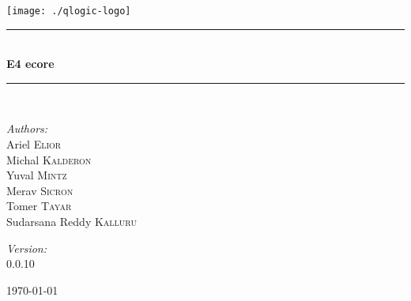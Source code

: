 \documentclass[11pt,fleqn,hidelinks,oneside]{book} %
\newcommand{\HRule}{\rule{\linewidth}{0.5mm}}
\begin{document}
\begin{titlepage}
\begin{center}

\texttt{[image: ./qlogic-logo]}~\\[3cm]

\HRule \\[0.4cm]
{ \huge \bfseries E4 ecore \\[0.4cm] }

\HRule \\[1.5cm]

\begin{minipage}{0.4\textwidth}
\begin{flushleft} \large
\emph{Authors:}\\
Ariel \textsc{Elior} \\
Michal \textsc{Kalderon} \\
Yuval \textsc{Mintz} \\
Merav \textsc{Sicron} \\
Tomer \textsc{Tayar} \\
Sudarsana Reddy \textsc{Kalluru} \\
\end{flushleft}
\end{minipage}
\begin{minipage}{0.4\textwidth}
\begin{flushright} \large
\emph{Version:} \\
0.0.10
\end{flushright}
\end{minipage}

\vfill

{\large \today}

\end{center}
\end{titlepage}

\pagestyle{empty} %
\tableofcontents %

\cleardoublepage %

\pagestyle{fancy} %


\end{document}
